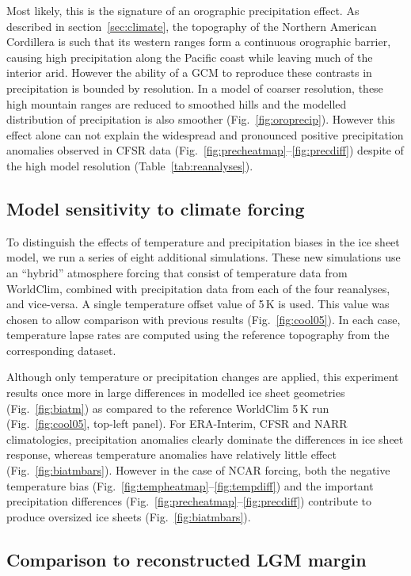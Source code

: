 Most likely, this is the signature of an orographic precipitation effect. As described in section~\ref{sec:climate}, the topography of the Northern American Cordillera is such that its western ranges form a continuous orographic barrier, causing high precipitation along the Pacific coast while leaving much of the interior arid. However the ability of a GCM to reproduce these contrasts in precipitation is bounded by resolution. In a model of coarser resolution, these high mountain ranges are reduced to smoothed hills and the modelled distribution of precipitation is also smoother (Fig.~\ref{fig:oroprecip}). However this effect alone can not explain the widespread and pronounced positive precipitation anomalies observed in CFSR data (Fig.~\ref{fig:precheatmap}--\ref{fig:precdiff}) despite of the high model resolution (Table~\ref{tab:reanalyses}).

\subsection{Model sensitivity to climate forcing}

To distinguish the effects of temperature and precipitation biases in the ice sheet model, we run a series of eight additional simulations. These new simulations use an “hybrid” atmosphere forcing that consist of temperature data from WorldClim, combined with precipitation data from each of the four reanalyses, and vice-versa. A single temperature offset value of 5\,K is used. This value was chosen to allow comparison with previous results (Fig.~\ref{fig:cool05}). In each case, temperature lapse rates are computed using the reference topography from the corresponding dataset.

Although only temperature or precipitation changes are applied, this experiment results once more in large differences in modelled ice sheet geometries (Fig.~\ref{fig:biatm}) as compared to the reference WorldClim 5\,K run (Fig.~\ref{fig:cool05}, top-left panel). For ERA-Interim, CFSR and NARR climatologies, precipitation anomalies clearly dominate the differences in ice sheet response, whereas temperature anomalies have relatively little effect (Fig.~\ref{fig:biatmbars}). However in the case of NCAR forcing, both the negative temperature bias (Fig.~\ref{fig:tempheatmap}--\ref{fig:tempdiff}) and the important precipitation differences (Fig.~\ref{fig:precheatmap}--\ref{fig:precdiff}) contribute to produce oversized ice sheets (Fig.~\ref{fig:biatmbars}).

\subsection{Comparison to reconstructed LGM margin}


